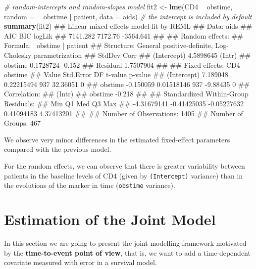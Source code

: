 \documentclass[]{book}
\makeatletter
\newenvironment{Shaded}{\begin{snugshade}}{\end{snugshade}}
\newcommand{\KeywordTok}[1]{\textcolor[rgb]{0.13,0.29,0.53}{\textbf{#1}}}
\newcommand{\DataTypeTok}[1]{\textcolor[rgb]{0.13,0.29,0.53}{#1}}
\newcommand{\StringTok}[1]{\textcolor[rgb]{0.31,0.60,0.02}{#1}}
\newcommand{\CommentTok}[1]{\textcolor[rgb]{0.56,0.35,0.01}{\textit{#1}}}
\newcommand{\OperatorTok}[1]{\textcolor[rgb]{0.81,0.36,0.00}{\textbf{#1}}}
\newcommand{\NormalTok}[1]{#1}
\newenvironment{kframe}{%
\medskip{}
\setlength{\fboxsep}{.8em}
 \def\at@end@of@kframe{}%
 \ifinner\ifhmode%
  \def\at@end@of@kframe{\end{minipage}}%
  \begin{minipage}{\columnwidth}%
 \fi\fi%
 \def\FrameCommand##1{\hskip\@totalleftmargin \hskip-\fboxsep
 \colorbox{shadecolor}{##1}\hskip-\fboxsep
     \hskip-\linewidth \hskip-\@totalleftmargin \hskip\columnwidth}%
 \MakeFramed {\advance\hsize-\width
   \@totalleftmargin\z@ \linewidth\hsize
   \@setminipage}}%
 {\par\unskip\endMakeFramed%
 \at@end@of@kframe}
\renewenvironment{Shaded}{\begin{kframe}}{\end{kframe}}
\theoremstyle{definition}
\theoremstyle{definition}
\theoremstyle{definition}
\theoremstyle{remark}
\makeatother
\begin{document}
\begin{Shaded}
\begin{Highlighting}[]
\CommentTok{# random-intercepts and random-slopes model}
\NormalTok{fit2 <-}\StringTok{ }\KeywordTok{lme}\NormalTok{(CD4 }\OperatorTok{~}\StringTok{ }\NormalTok{obstime, }\DataTypeTok{random =} \OperatorTok{~}\StringTok{ }\NormalTok{obstime }\OperatorTok{|}\StringTok{ }\NormalTok{patient, }\DataTypeTok{data =}\NormalTok{ aids) }\CommentTok{# the intercept is  included by default}
\KeywordTok{summary}\NormalTok{(fit2)}
\NormalTok{## Linear mixed-effects model fit by REML}
\NormalTok{##  Data: aids }
\NormalTok{##        AIC     BIC    logLik}
\NormalTok{##   7141.282 7172.76 -3564.641}
\NormalTok{## }
\NormalTok{## Random effects:}
\NormalTok{##  Formula: ~obstime | patient}
\NormalTok{##  Structure: General positive-definite, Log-Cholesky parametrization}
\NormalTok{##             StdDev    Corr  }
\NormalTok{## (Intercept) 4.5898645 (Intr)}
\NormalTok{## obstime     0.1728724 -0.152}
\NormalTok{## Residual    1.7507904       }
\NormalTok{## }
\NormalTok{## Fixed effects: CD4 ~ obstime }
\NormalTok{##                 Value  Std.Error  DF  t-value p-value}
\NormalTok{## (Intercept)  7.189048 0.22215494 937 32.36051       0}
\NormalTok{## obstime     -0.150059 0.01518146 937 -9.88435       0}
\NormalTok{##  Correlation: }
\NormalTok{##         (Intr)}
\NormalTok{## obstime -0.218}
\NormalTok{## }
\NormalTok{## Standardized Within-Group Residuals:}
\NormalTok{##         Min          Q1         Med          Q3         Max }
\NormalTok{## -4.31679141 -0.41425035 -0.05227632  0.41094183  4.37413201 }
\NormalTok{## }
\NormalTok{## Number of Observations: 1405}
\NormalTok{## Number of Groups: 467}
\end{Highlighting}
\end{Shaded}

We observe very minor differences in the estimated fixed-effect
parameters compared with the previous model.

For the random effects, we can observe that there is greater variability
between patients in the baseline levels of CD4 (given by
\texttt{(Intercept)} variance) than in the evolutions of the marker in
time (\texttt{obstime} variance).

\section{Estimation of the Joint
Model}\label{estimation-of-the-joint-model}

In this section we are going to present the joint modelling framework
motivated by the \textbf{time-to-event point of view}, that is, we want
to add a time-dependent covariate measured with error in a survival
model.
\end{document}
